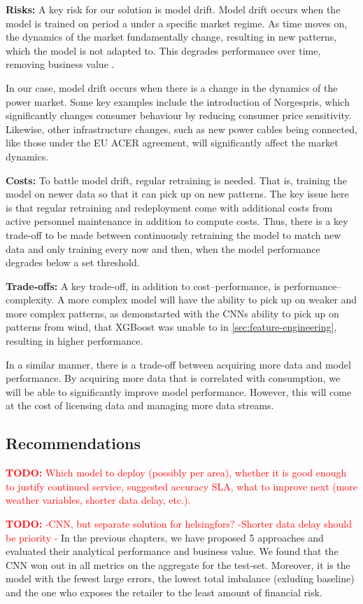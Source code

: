 \documentclass[11pt,a4paper]{article}
\newcommand{\todo}[1]{\textcolor{red}{\textbf{TODO:} #1}}
\begin{document}
\textbf{Risks:}
A key risk for our solution is model drift. Model drift occurs when the model is trained on period a under a specific market regime. As time moves on, the dynamics of the market fundamentally change, resulting in new patterns, which the model is not adapted to. This degrades performance over time, removing business value \cite{ibm_model_drift}.

In our case, model drift occurs when there is a change in the dynamics of the power market. Some key examples include the introduction of Norgespris, which significantly changes consumer behaviour by reducing consumer price sensitivity. Likewise, other infrastructure changes, such as new power cables being connected, like those under the EU ACER agreement, will significantly affect the market dynamics.

\textbf{Costs:}
To battle model drift, regular retraining is needed. That is, training the model on newer data so that it can pick up on new patterns. The key issue here is that regular retraining and redeployment come with additional costs from active personnel maintenance in addition to compute costs. Thus, there is a key trade-off to be made between continuously retraining the model to match new data and only training every now and then, when the model performance degrades below a set threshold.

\textbf{Trade-offs:}
A key trade-off, in addition to cost--performance, is performance--complexity. A more complex model will have the ability to pick up on weaker and more complex patterns, as demonstarted with the CNNs ability to pick up on patterns from wind, that XGBoost was unable to in \cref{sec:feature-engineering}, resulting in higher performance.

In a similar manner, there is a trade-off between acquiring more data and model performance. By acquiring more data that is correlated with consumption, we will be able to significantly improve model performance. However, this will come at the cost of licensing data and managing more data streams.

\subsection{Recommendations}
\todo{Which model to deploy (possibly per area), whether it is good enough to justify continued service, suggested accuracy SLA, what to improve next (more weather variables, shorter data delay, etc.).}

\todo{-CNN, but separate solution for helsingfors?
-Shorter data delay should be priority
-}\newline
In the previous chapters, we have proposed 5 approaches and evaluated their analytical performance and business value. We found that the CNN won out in all metrics on the aggregate for the test-set. Moreover, it is the model with the fewest large errors, the lowest total imbalance (exluding baseline) and the one who exposes the retailer to the least amount of financial risk.
\end{document}
